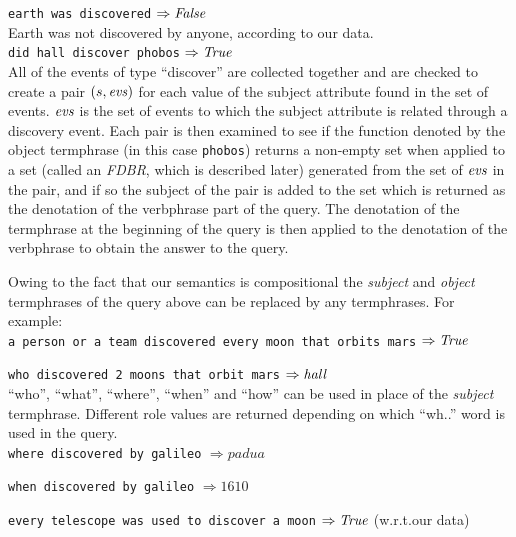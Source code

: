 \documentclass[../main.tex]{subfiles}
\begin{document}
\begin{refsection}
\noindent \texttt{earth was discovered} $\Rightarrow \mathit{False}$ \\

Earth was not discovered by anyone, according to our data. \\

\noindent \texttt{did hall discover phobos} $\Rightarrow \mathit{True}$ \\


All of the events of type ``discover'' are collected together and are checked to create a pair $(s, \mathit{evs})$ for each value of the subject attribute found in the set of events. $\mathit{evs}$ is the set of events to which the subject attribute is related through a discovery event.  Each pair is then examined to see if the function denoted by the object termphrase (in this case \texttt{phobos}) returns a non-empty set when applied to a set (called an \textit{FDBR}, which is described later) generated from the set of $\mathit{evs}$ in the pair, and if so the subject of the pair is added to the set which is returned as the denotation of the verbphrase part of the query. The denotation of the termphrase at the beginning of the query is then applied to the denotation of the verbphrase to obtain the answer to the query. %

Owing to the fact that our semantics is compositional the \textit{subject} and \textit{object} termphrases of the query above can be replaced by any termphrases. For example: \\

\noindent \texttt{a person or a team  discovered every moon that orbits mars} $\Rightarrow \mathit{True}$

\noindent \texttt{who discovered 2 moons that orbit mars} $\Rightarrow \mathit{hall}$ \\

``who'', ``what'', ``where'', ``when'' and ``how'' can be used in place of the \textit{subject} termphrase. Different role values are returned depending on which ``wh..'' word is used in the query. \\

\noindent \texttt{where discovered by galileo} $\Rightarrow \mathit{padua}$

\noindent \texttt{when discovered by galileo} $\Rightarrow \mathit{1610}$

\noindent \texttt{every telescope was used to discover a moon} $\Rightarrow \mathit{True}$ (w.r.t.our data)


\end{refsection}
\end{document}
